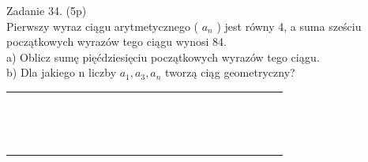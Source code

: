 \documentclass[10pt]{article}
\begin{document}
Zadanie 34. (5p)\\
Pierwszy wyraz ciągu arytmetycznego ( \(a_{n}\) ) jest równy 4, a suma sześciu początkowych wyrazów tego ciągu wynosi 84.\\
a) Oblicz sumę pięćdziesięciu początkowych wyrazów tego ciągu.\\
b) Dla jakiego n liczby \(a_{1}, a_{3}, a_{n}\) tworzą ciąg geometryczny?

\begin{center}
\begin{tabular}{|c|c|c|c|c|c|c|c|c|c|c|c|c|c|c|c|c|c|c|c|c|c|c|c|c|}
\hline
 &  &  &  &  &  &  &  &  &  &  &  &  &  &  &  &  &  &  &  &  &  &  &  &  \\
\hline
 &  &  &  &  &  &  &  &  &  &  &  &  &  &  &  &  &  &  &  &  &  &  &  &  \\
\hline
 &  &  &  &  &  &  &  &  &  &  &  &  &  &  &  &  &  &  &  &  &  &  &  &  \\
\hline
 &  &  &  &  &  &  &  &  &  &  &  &  &  &  &  &  &  &  &  &  &  &  &  &  \\
\hline
 &  &  &  &  &  &  &  &  &  &  &  &  &  &  &  &  &  &  &  &  &  &  &  &  \\
\hline
 &  &  &  &  &  &  &  &  &  &  &  &  &  &  &  &  &  &  &  &  &  &  &  &  \\
\hline
 &  &  &  &  &  &  &  &  &  &  &  &  &  &  &  &  &  &  &  &  &  &  &  &  \\
\hline
 &  &  &  &  &  &  &  &  &  &  &  &  &  &  &  &  &  &  &  &  &  &  &  &  \\
\hline
 &  &  &  &  &  &  &  &  &  &  &  &  &  &  &  &  &  &  &  &  &  &  &  &  \\
\hline
 &  &  &  &  &  &  &  &  &  &  &  &  &  &  &  &  &  &  &  &  &  &  &  &  \\
\hline
 &  &  &  &  &  &  &  &  &  &  &  &  &  &  &  &  &  &  &  &  &  &  &  &  \\
\hline
 &  &  &  &  &  &  &  &  &  &  &  &  &  &  &  &  &  &  &  &  &  &  &  &  \\
\hline
 &  &  &  &  &  &  &  &  &  &  &  &  &  &  &  &  &  &  &  &  &  &  &  &  \\
\hline
 &  &  &  &  &  &  &  &  &  &  &  &  &  &  &  &  &  &  &  &  &  &  &  &  \\
\hline
 &  &  &  &  &  &  &  &  &  &  &  &  &  &  &  &  &  &  &  &  &  &  &  &  \\
\hline
 &  &  &  &  &  &  &  &  &  &  &  &  &  &  &  &  &  &  &  &  &  &  &  &  \\
\hline
\end{tabular}
\end{center}
\end{document}
